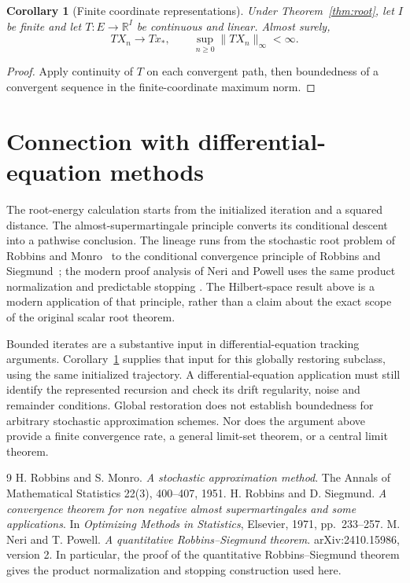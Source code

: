 \documentclass[11pt]{article}
\newtheorem{corollary}[theorem]{Corollary}
\newcommand{\R}{\mathbb R}
\begin{document}
\begin{corollary}[Finite coordinate representations]\label{cor:coordinates}
Under Theorem~\ref{thm:root}, let $I$ be finite and let
$T:E\to\R^I$ be continuous and linear. Almost surely,
\[
 T X_n\longrightarrow T x_*,\qquad
 \sup_{n\ge0}\|T X_n\|_\infty<\infty.
\]
\end{corollary}
\begin{proof}
Apply continuity of $T$ on each convergent path, then boundedness of a
convergent sequence in the finite-coordinate maximum norm.
\end{proof}

\section{Connection with differential-equation methods}
The root-energy calculation starts from the initialized iteration and a
squared distance. The almost-supermartingale principle converts its
conditional descent into a pathwise conclusion. The lineage runs from the
stochastic root problem of Robbins and Monro~\cite{rm} to the conditional
convergence principle of Robbins and Siegmund~\cite{rs}; the modern proof analysis of Neri and
Powell uses the same product normalization and predictable stopping
\cite{np}. The Hilbert-space result above is a modern application of that
principle, rather than a claim about the exact scope of the original scalar
root theorem.

Bounded iterates are a substantive input in differential-equation tracking
arguments. Corollary~\ref{cor:coordinates} supplies that input for this
globally restoring subclass, using the same initialized trajectory.
A differential-equation application must still identify the represented
recursion and check its drift regularity, noise and remainder conditions.
Global restoration does not establish boundedness for arbitrary stochastic
approximation schemes. Nor does the argument above provide a finite
convergence rate, a general limit-set theorem, or a central limit theorem.

\begin{thebibliography}{9}
 H. Robbins and S. Monro.
\emph{A stochastic approximation method}.
The Annals of Mathematical Statistics 22(3), 400--407, 1951.
 H. Robbins and D. Siegmund.
\emph{A convergence theorem for non negative almost supermartingales and some
applications}. In \emph{Optimizing Methods in Statistics}, Elsevier, 1971,
pp.\ 233--257.
 M. Neri and T. Powell.
\emph{A quantitative Robbins--Siegmund theorem}.
arXiv:2410.15986, version 2. In particular, the proof of the quantitative
Robbins--Siegmund theorem gives the product normalization and stopping
construction used here.
\end{thebibliography}
\end{document}

